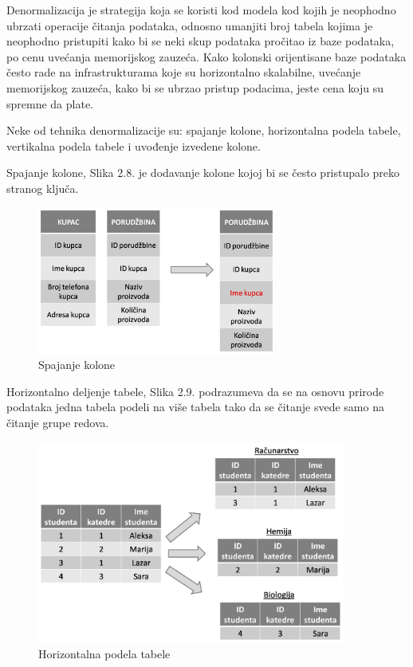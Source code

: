 \documentclass[12pt,oneside]{memoir}
\begin{document}
Denormalizacija je strategija koja se koristi kod modela kod kojih je neophodno ubrzati operacije čitanja podataka, odnosno umanjiti broj tabela kojima je neophodno pristupiti kako bi se neki skup podataka pročitao iz baze podataka, po cenu uvećanja memorijskog zauzeća. Kako kolonski orijentisane baze podataka često rade na infrastrukturama koje su horizontalno skalabilne, uvećanje memorijskog zauzeća, kako bi se ubrzao pristup podacima, jeste cena koju su spremne da plate.
 
Neke od tehnika denormalizacije su:  spajanje kolone, horizontalna podela tabele, vertikalna podela tabele i uvođenje izvedene kolone. 

Spajanje kolone, Slika 2.8. je dodavanje kolone kojoj bi se često pristupalo preko stranog ključa.

\begin{figure}[!ht]
  \centering
  \includegraphics[width=0.7\textwidth]{denormalizacija.png}
  \caption{Spajanje kolone}
  \label{fig:grafikon}
\end{figure}

Horizontalno deljenje tabele, Slika 2.9. podrazumeva da se na osnovu prirode podataka jedna tabela podeli na više tabela tako da se čitanje svede samo na čitanje grupe redova. 

\begin{figure}[!ht]
  \centering
  \includegraphics[width=0.9\textwidth]{denormalizacija2.png}
  \caption{Horizontalna podela tabele}
  \label{fig:grafikon}
\end{figure}
\end{document}
